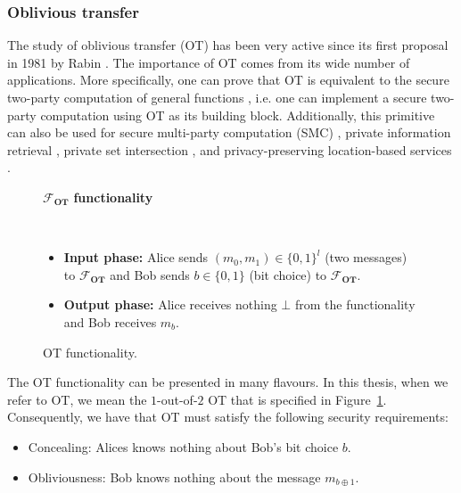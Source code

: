\subsubsection{Oblivious transfer}

The study of oblivious transfer (OT) has been very active since its first proposal in 1981 by Rabin \cite{Rabin81}. The importance of OT comes from its wide number of applications. More specifically, one can prove that OT is equivalent to the secure two-party computation of general functions \cite{Y86, K88}, i.e. one can implement a secure two-party computation using OT as its building block. Additionally, this primitive can also be used for secure multi-party computation (SMC) \cite{KOS16}, private information retrieval \cite{Che04}, private set intersection \cite{MEP17}, and privacy-preserving location-based services \cite{BHM+19}.

\begin{figure}[h!]
\centering
\begin{tcolorbox}
                        
    \centerline{$\mathcal{F}_{\textbf{OT}}$ \textbf{functionality}}
            
    \
    
    \begin{itemize}
    		\item \textbf{Input phase:} Alice sends $(m_0, m_1)\in\{0,1\}^l$ (two messages) to $\mathcal{F}_{\textbf{OT}}$ and Bob sends $b\in\{0,1\}$ (bit choice) to $\mathcal{F}_{\textbf{OT}}$.
    		\item \textbf{Output phase:} Alice receives nothing $\bot$ from the functionality and Bob receives $m_b$.
    \end{itemize}
    
\end{tcolorbox} 
    \caption{OT functionality.}
    \label{fig:OT_functionality}
\end{figure}

The OT functionality can be presented in many flavours. In this thesis, when we refer to OT, we mean the $1$-out-of-$2$ OT that is specified in Figure~\ref{fig:OT_functionality}. Consequently, we have that OT must satisfy the following security requirements:

\begin{itemize}
	\item Concealing: Alices knows nothing about Bob's bit choice $b$.
	\item Obliviousness: Bob knows nothing about the message $m_{b\oplus 1}$.
\end{itemize}

